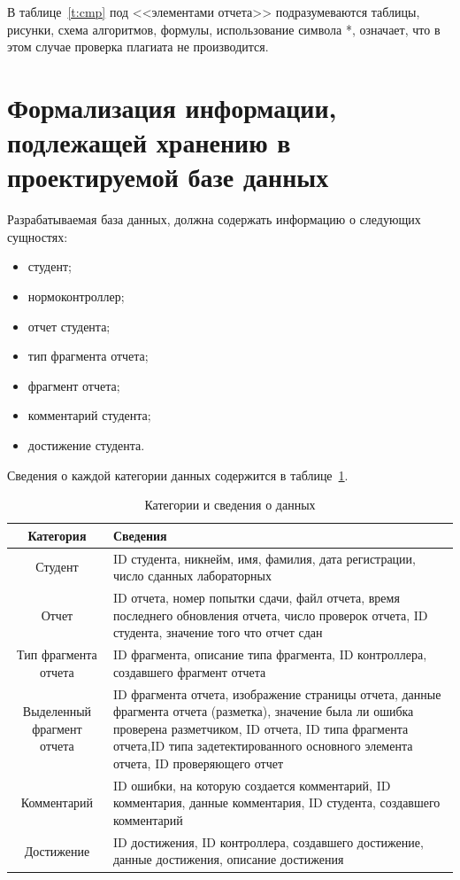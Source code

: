 В таблице~\ref{t:cmp} под <<элементами отчета>> подразумеваются таблицы, рисунки, схема алгоритмов, формулы, использование символа *, означает, что в этом случае проверка плагиата не производится.

\section{Формализация информации, подлежащей хранению в проектируемой базе данных}
Разрабатываемая база данных, должна содержать информацию о следующих сущностях:
\begin{itemize}
	\item студент;
	\item нормоконтроллер;
	\item отчет студента;
	\item тип фрагмента отчета;
	\item фрагмент отчета;
	\item комментарий студента;
	\item достижение студента.
\end{itemize}

Сведения о каждой категории данных содержится в таблице~\ref{t:data_store}.

\begin{table}[ht]
	\begin{center}
		\begin{threeparttable}
			\caption{\label{t:data_store} Категории и сведения о данных}
			\begin{tabular}{|c|p{8cm}|}
				\hline
				\textbf{Категория} & \textbf{Сведения} \\ \hline
				Студент & ID студента, никнейм, имя, фамилия, дата регистрации, число сданных лабораторных\\ \hline
				Отчет & ID отчета, номер попытки сдачи, файл отчета, время последнего обновления отчета, число проверок отчета, ID студента, значение того что отчет сдан \\ \hline
				Тип фрагмента отчета & ID фрагмента, описание типа фрагмента, ID контроллера, создавшего фрагмент отчета \\ \hline
				Выделенный фрагмент отчета & ID фрагмента отчета, изображение страницы отчета, данные фрагмента отчета (разметка), значение была ли ошибка проверена разметчиком, ID отчета, ID типа фрагмента отчета,ID типа задетектированного основного элемента отчета, ID проверяющего отчет\\ \hline
				Комментарий & ID ошибки, на которую создается комментарий, ID комментария, данные комментария, ID студента, создавшего комментарий \\ \hline
				Достижение & ID достижения, ID контроллера, создавшего достижение, данные достижения, описание достижения \\ \hline
			\end{tabular}
		\end{threeparttable}
	\end{center}
\end{table}

